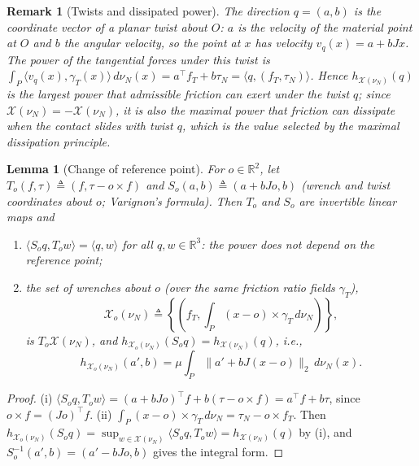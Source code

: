 \documentclass[11pt,a4paper]{article}
\theoremstyle{plain}
\newtheorem{lemma}[theorem]{Lemma}
\newtheorem{remark}[theorem]{Remark}
\newcommand{\R}{\mathbb{R}}
\newcommand{\X}{\mathcal X}
\begin{document}
\begin{remark}[Twists and dissipated power]
\label{rem:power}
    The direction $q=(a,b)$ is the coordinate vector of a planar twist about $O$: $a$ is the velocity of the material point at $O$ and $b$ the angular velocity, so the
    point at $x$ has velocity $v_q(x)=a+bJx$. The power of the tangential forces under this twist is
    $\int_P\langle v_q(x),\gamma_T(x)\rangle\,d\nu_N(x)=a^\top f_T+b\tau_N=\langle q,(f_T,\tau_N)\rangle$. Hence $h_{\X(\nu_N)}(q)$ is the largest power that admissible friction can
    exert under the twist $q$; since $\X(\nu_N)=-\X(\nu_N)$, it is also the maximal power that friction can dissipate when the contact slides with twist $q$, which is the
    value selected by the maximal dissipation principle. 
\end{remark}

\begin{lemma}[Change of reference point]
\label{lem:varignon}
    For $o\in\R^2$, let $T_o(f,\tau)\triangleq(f,\tau-o\times f)$ and $S_o(a,b)\triangleq(a+bJo,b)$ (wrench and twist coordinates about $o$; Varignon's formula). Then $T_o$ and $S_o$ are
    invertible linear maps and
    \begin{enumerate}[label=(\roman*)]
        \item $\langle S_oq,T_ow\rangle=\langle q,w\rangle$ for all $q,w\in\R^3$: the power does not depend on the reference point;
        \item the set of wrenches about $o$ (over the same friction ratio fields $\gamma_T$),
        \[\X_o(\nu_N)\triangleq\left\{\left(f_T,\textstyle\int_P(x-o)\times\gamma_T\,d\nu_N\right)\right\},\]
        is $T_o\X(\nu_N)$, and $h_{\X_o(\nu_N)}(S_oq)=h_{\X(\nu_N)}(q)$, i.e.,
        \[h_{\X_o(\nu_N)}(a',b)=\mu\int_P\|a'+bJ(x-o)\|_2\,d\nu_N(x).\]
    \end{enumerate}
\end{lemma}
\begin{proof}
    (i) $\langle S_oq,T_ow\rangle=(a+bJo)^\top f+b(\tau-o\times f)=a^\top f+b\tau$, since $o\times f=(Jo)^\top f$.
    (ii) $\int_P(x-o)\times\gamma_T\,d\nu_N=\tau_N-o\times f_T$. Then $h_{\X_o(\nu_N)}(S_oq)=\sup_{w\in\X(\nu_N)}\langle S_oq,T_ow\rangle=h_{\X(\nu_N)}(q)$ by (i),
    and $S_o^{-1}(a',b)=(a'-bJo,b)$ gives the integral form.
\end{proof}
\end{document}

